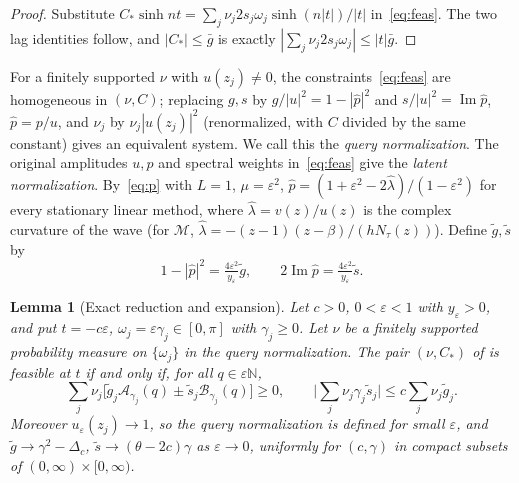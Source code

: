\documentclass[11pt]{article}
\newtheorem{lemma}[theorem]{Lemma}
\theoremstyle{definition}
\theoremstyle{remark}
\newcommand{\N}{\mathbb N}
\newcommand{\cM}{\mathcal M}
\newcommand{\cA}{\mathcal A}
\newcommand{\cB}{\mathcal B}
\newcommand{\sh}{\sinh}
\newcommand{\Ima}{\operatorname{Im}}
\newcommand{\gt}{\tilde g}
\newcommand{\st}{\tilde s}
\begin{document}
\begin{proof}
Substitute
\(C_*\sh nt=\sum_j\nu_j2s_j\omega_j\sh(n|t|)/|t|\)
in~\eqref{eq:feas}.  The two lag identities follow, and
\(|C_*|\le\bar g\) is exactly
\(|\sum_j\nu_j2s_j\omega_j|\le|t|\bar g\).
\end{proof}

For a finitely supported \(\nu\) with \(u(z_j)\ne0\), the constraints~\eqref{eq:feas}
are homogeneous in \((\nu,C)\); replacing \(g,s\) by \(g/|u|^2=1-|\hat p|^2\) and
\(s/|u|^2=\Ima\hat p\), \(\hat p=p/u\), and \(\nu_j\) by \(\nu_j|u(z_j)|^2\) (renormalized, with \(C\)
divided by the same constant) gives an equivalent system.  We call this the
\emph{query normalization}.  The original amplitudes \(u,p\) and spectral
weights in~\eqref{eq:feas} give the \emph{latent normalization}.
By~\eqref{eq:p} with \(L=1\), \(\mu=\varepsilon^2\),
\(\hat p=(1+\varepsilon^2-2\hat\lambda)/(1-\varepsilon^2)\) for every stationary linear method, where
\(\hat\lambda=v(z)/u(z)\) is the complex curvature of the wave (for \(\cM\), \(\hat\lambda=-(z-1)(z-\beta)/(hN_\tau(z))\)).
Define \(\gt,\st\) by
\begin{equation}\label{eq:gtst}
1-|\hat p|^2=\tfrac{4\varepsilon^2}{y_\varepsilon}\gt,\qquad 2\Ima\hat p=\tfrac{4\varepsilon^2}{y_\varepsilon}\st .
\end{equation}

\begin{lemma}[Exact reduction and expansion]\label{lem:reduce}
Let \(c>0\), \(0<\varepsilon<1\) with \(y_\varepsilon>0\), and put \(t=-c\varepsilon\), \(\omega_j=\varepsilon\gamma_j\in[0,\pi]\) with \(\gamma_j\ge0\).  Let \(\nu\) be a finitely supported probability
measure on \(\{\omega_j\}\) in the query normalization.  The pair \((\nu,C_*)\)
of  is feasible at \(t\) if and only if, for all
\(q\in\varepsilon\N\),
\[
\textstyle\sum_j\nu_j\bigl[\gt_j\cA_{\gamma_j}(q)\pm\st_j\cB_{\gamma_j}(q)\bigr]\ge0,\qquad
\bigl|\sum_j\nu_j\gamma_j\st_j\bigr|\le c\sum_j\nu_j\gt_j .
\]
Moreover \(u_\varepsilon(z_j)\to1\), so the query normalization is defined for small
\(\varepsilon\), and \(\gt\to\gamma^2-\Delta_c\), \(\st\to(\theta-2c)\gamma\) as \(\varepsilon\to0\),
uniformly for \((c,\gamma)\) in compact subsets of \((0,\infty)\times[0,\infty)\).
\end{lemma}
\end{document}
